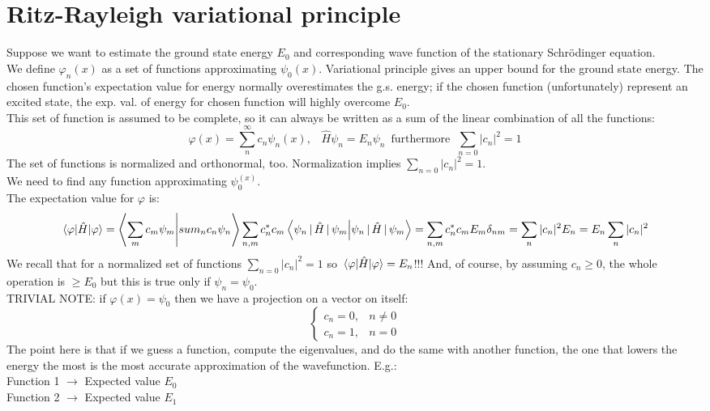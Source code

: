 \section{Ritz-Rayleigh variational principle}
Suppose we want to estimate the ground state energy $E_0$ and corresponding wave function of the stationary Schr\"{o}dinger equation.\\
We define $\varphi_n(x)$ as a set of functions approximating $\psi_0(x)$. Variational principle gives an upper bound for the ground state energy. The chosen function's expectation value for energy normally overestimates the g.s. energy; if the chosen function (unfortunately) represent an excited state, the exp. val. of energy for chosen function will highly overcome $E_0$.\\
This set of function is assumed to be complete, so it can always be written as a sum of the linear combination of all the functions:
\[
\varphi(x)=\sum_{n}^{\infty}c_n\psi_n(x),\;\;\; \hat{H}\psi_n=E_n\psi_n\, \text{ furthermore} \;\; \sum_{n=0}|c_n|^2=1
\]
The set of functions is normalized and orthonormal, too. Normalization implies $\sum_{n=0}|c_n|^2=1$.\\
We need to find any function approximating $\psi_0^{(x)}$.\\
The expectation value for $\varphi$ is:
\[
\mel{\varphi}{\hat{H}}{\varphi}=
\braket{\sum_mc_m\psi_m}{sum_nc_n\psi_n}
\sum_{n,m}c_n^{*}c_m\braket{\psi_n\,|\,\hat{H}\,|\,\psi_m}=\sum_{n,m}c_n^{*}c_mE_m\delta_{nm}=
\sum_{n}|c_n|^2E_n=
E_n\sum_n |c_n|^2
\]
We recall that for a normalized set of functions $\sum_{n=0}|c_n|^2=1$ so $\mel{\varphi}{\hat{H}}{\varphi}=E_n$!!! And, of course, by assuming $c_n \geq 0$, the whole operation is $\geq E_0$ but this is true only if $\psi_n=\psi_0$.\\
\newline
TRIVIAL NOTE: if $\varphi(x)=\psi_0$ then we have a projection on a vector on itself:
\[
\begin{cases}
c_n=0, & n \neq 0\\
c_n=1, & n=0
\end{cases}
\]
\newline
The point here is that if we guess a function, compute the eigenvalues, and do the same with another function, the one that lowers the energy the most is the most accurate approximation of the wavefunction.
E.g.:\\
Function 1 $\rightarrow$ Expected value $E_0$\\
Function 2 $\rightarrow$ Expected value $E_1$\\
